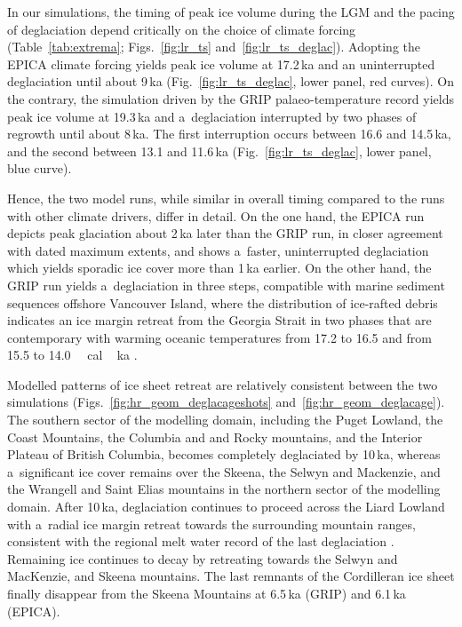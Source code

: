 \documentclass[tc, manuscript]{copernicus}
\begin{document}
      In our simulations, the timing of peak ice volume during the LGM and
      the pacing of deglaciation depend critically on the choice of climate
      forcing (Table~\ref{tab:extrema}; Figs.~\ref{fig:lr_ts}
      and~\ref{fig:lr_ts_deglac}). Adopting the EPICA climate forcing yields
      peak ice volume at 17.2\,\unit{ka} and an uninterrupted deglaciation
      until about 9\,\unit{ka} (Fig.~\ref{fig:lr_ts_deglac}, lower panel,
      red curves). On the contrary, the simulation driven by the GRIP
      palaeo-temperature record yields peak ice volume at 19.3\,\unit{ka}
      and a~deglaciation interrupted by two phases of regrowth until about
      8\,\unit{ka}. The first interruption occurs between 16.6 and
      14.5\,\unit{ka}, and the second between 13.1 and 11.6\,\unit{ka}
      (Fig.~\ref{fig:lr_ts_deglac}, lower panel, blue curve).

      Hence, the two model runs, while similar in overall timing compared to
      the runs with other climate drivers, differ in detail. On the one
      hand, the EPICA run depicts peak glaciation about 2\,\unit{ka} later
      than the GRIP run, in closer agreement with dated maximum extents, and
      shows a~faster, uninterrupted deglaciation which yields sporadic ice
      cover more than 1\,\unit{ka} earlier. On the other hand, the GRIP run
      yields a~deglaciation in three steps, compatible with marine sediment
      sequences offshore Vancouver Island, where the distribution of
      ice-rafted debris indicates an ice margin retreat from the Georgia
      Strait in two phases that are contemporary with warming oceanic
      temperatures from 17.2 to 16.5 and from 15.5 to
      14.0\,\unit{\,cal\,ka} \citep{Taylor.etal.2014}.

      Modelled patterns of ice sheet retreat are relatively consistent
      between the two simulations (Figs.~\ref{fig:hr_geom_deglacageshots}
      and~\ref{fig:hr_geom_deglacage}). The southern sector of the modelling
      domain, including the Puget Lowland, the Coast Mountains, the Columbia
      and and Rocky mountains, and the Interior Plateau of British Columbia,
      becomes completely deglaciated by 10\,\unit{ka}, whereas a~significant
      ice cover remains over the Skeena, the Selwyn and Mackenzie, and the
      Wrangell and Saint Elias mountains in the northern sector of the
      modelling domain. After 10\,\unit{ka}, deglaciation continues to
      proceed across the Liard Lowland with a~radial ice margin retreat
      towards the surrounding mountain ranges, consistent with the regional
      melt water record of the last deglaciation \citep{Margold.etal.2013}.
      Remaining ice continues to decay by retreating towards the Selwyn and
      MacKenzie, and Skeena mountains. The last remnants of the Cordilleran
      ice sheet finally disappear from the Skeena Mountains at
      6.5\,\unit{ka} (GRIP) and 6.1\,\unit{ka} (EPICA).
\end{document}
